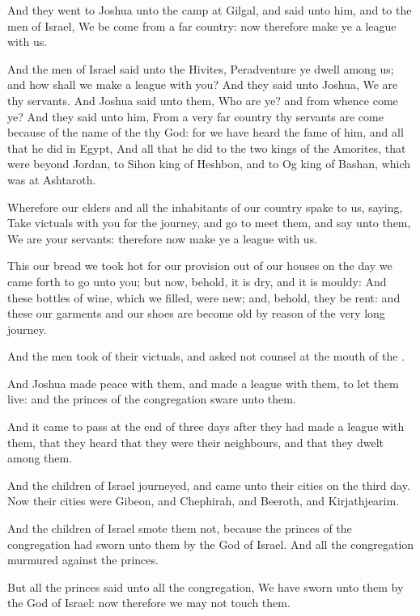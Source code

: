\Verse And they went to Joshua unto the camp at Gilgal, and said unto him, and to the men of Israel, We be come from a far country: now therefore make ye a league with us.

\Verse And the men of Israel said unto the Hivites, Peradventure ye dwell among us; and how shall we make a league with you?  \Verse And they said unto Joshua, We are thy servants. And Joshua said unto them, Who are ye? and from whence come ye?  \Verse And they said unto him, From a very far country thy servants are come because of the name of the \LORD thy God: for we have heard the fame of him, and all that he did in Egypt, \Verse And all that he did to the two kings of the Amorites, that were beyond Jordan, to Sihon king of Heshbon, and to Og king of Bashan, which was at Ashtaroth.

\Verse Wherefore our elders and all the inhabitants of our country spake to us, saying, Take victuals with you for the journey, and go to meet them, and say unto them, We are your servants: therefore now make ye a league with us.

\Verse This our bread we took hot for our provision out of our houses on the day we came forth to go unto you; but now, behold, it is dry, and it is mouldy: \Verse And these bottles of wine, which we filled, were new; and, behold, they be rent: and these our garments and our shoes are become old by reason of the very long journey.

\Verse And the men took of their victuals, and asked not counsel at the mouth of the \LORD.

\Verse And Joshua made peace with them, and made a league with them, to let them live: and the princes of the congregation sware unto them.

\Verse And it came to pass at the end of three days after they had made a league with them, that they heard that they were their neighbours, and that they dwelt among them.

\Verse And the children of Israel journeyed, and came unto their cities on the third day. Now their cities were Gibeon, and Chephirah, and Beeroth, and Kirjathjearim.

\Verse And the children of Israel smote them not, because the princes of the congregation had sworn unto them by the \LORD God of Israel. And all the congregation murmured against the princes.

\Verse But all the princes said unto all the congregation, We have sworn unto them by the \LORD God of Israel: now therefore we may not touch them.

